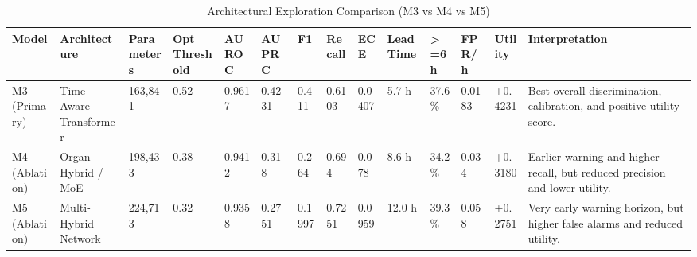 \begin{table}[htbp]
\centering
\caption{Architectural Exploration Comparison (M3 vs M4 vs M5)}
\label{tab:arch_exploration}
\begin{tabular}{llllllllllllll}
\hline
\textbf{Model} & \textbf{Architecture} & \textbf{Parameters} & \textbf{Opt Threshold} & \textbf{AUROC} & \textbf{AUPRC} & \textbf{F1} & \textbf{Recall} & \textbf{ECE} & \textbf{Lead Time} & \textbf{>=6h} & \textbf{FPR/h} & \textbf{Utility} & \textbf{Interpretation} \\
\hline
M3 (Primary) & Time-Aware Transformer & 163,841 & 0.52 & 0.9617 & 0.4231 & 0.411 & 0.6103 & 0.0407 & 5.7 h & 37.6\% & 0.0183 & +0.4231 & Best overall discrimination, calibration, and positive utility score. \\
M4 (Ablation) & Organ Hybrid / MoE & 198,433 & 0.38 & 0.9412 & 0.318 & 0.264 & 0.694 & 0.078 & 8.6 h & 34.2\% & 0.034 & +0.3180 & Earlier warning and higher recall, but reduced precision and lower utility. \\
M5 (Ablation) & Multi-Hybrid Network & 224,713 & 0.32 & 0.9358 & 0.2751 & 0.1997 & 0.7251 & 0.0959 & 12.0 h & 39.3\% & 0.058 & +0.2751 & Very early warning horizon, but higher false alarms and reduced utility. \\
\hline
\end{tabular}
\end{table}